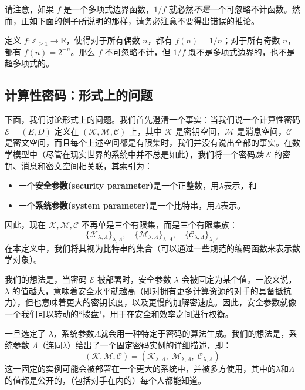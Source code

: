 请注意，如果 $f$ 是一个多项式边界函数，$1/f$ 就必然\emph{不是}一个可忽略不计函数。然而，正如下面的例子所说明的那样，请务必注意不要得出错误的推论。

\begin{example}
定义 $f:\mathbb{Z}_{\geq1}\to\mathbb{R}$，使得对于所有偶数 $n$，都有 $f(n)={1}/{n}$；对于所有奇数 $n$，都有 $f(n)=2^{-n}$。那么 $f$ 不可忽略不计，但 $1/f$ 既不是多项式边界的，也不是超多项式的。
\end{example}


\subsection{计算性密码：形式上的问题}

下面，我们讨论形式上的问题。我们首先澄清一个事实：当我们说一个计算性密码 $\mathcal{E}=(E,D)$ 定义在 $(\mathcal{K},\mathcal{M},\mathcal{C})$ 上，其中 $\mathcal{K}$ 是密钥空间，$\mathcal{M}$ 是消息空间，$\mathcal{C}$ 是密文空间，而且每个上述空间都是有限集时，我们并没有说出全部的事实。在数学模型中（尽管在现实世界的系统中并不总是如此），我们将一个密码\emph{族} $\mathcal{E}$ 的密钥、消息和密文空间相关联，其索引为：
\begin{itemize}
	\item 一个\textbf{安全参数(security parameter)}是一个正整数，用$\lambda$表示，和
	\item 一个\textbf{系统参数(system parameter)}是一个比特串，用$\Lambda$表示。
\end{itemize}
因此，现在 $\mathcal{K},\mathcal{M},\mathcal{C}$ 不再单是三个有限集，而是三个有限集族：
\[
\{\mathcal{K}_{\lambda,\Lambda}\}_{\lambda,\Lambda},\quad
\{\mathcal{M}_{\lambda,\Lambda}\}_{\lambda,\Lambda},\quad
\{\mathcal{C}_{\lambda,\Lambda}\}_{\lambda,\Lambda}
\]
在本定义中，我们将其视为比特串的集合（可以通过一些规范的编码函数来表示数学对象）。

我们的想法是，当密码 $\mathcal{E}$ 被部署时，安全参数 $\lambda$ 会被固定为某个值。一般来说，$\lambda$ 的值越大，意味着安全水平就越高（即对拥有更多计算资源的对手的具备抵抗力），但也意味着更大的密钥长度，以及更慢的加解密速度。因此，安全参数就像一个我们可以转动的``拨盘"，用于在安全和效率之间进行权衡。

一旦选定了 $\lambda$，系统参数$\Lambda$就会用一种特定于密码的算法生成。我们的想法是，系统参数 $\Lambda$（连同$\lambda$）给出了一个固定密码实例的详细描述，即：
\[
(\mathcal{K},\mathcal{M},\mathcal{C})=(\mathcal{K}_{\lambda,\Lambda},\;\mathcal{M}_{\lambda,\Lambda},\;\mathcal{C}_{\lambda,\Lambda})
\]
这一固定的实例可能会被部署在一个更大的系统中，并被多方使用，其中的$\lambda$和$\Lambda$的值都是公开的，（包括对手在内的）每个人都能知道。

